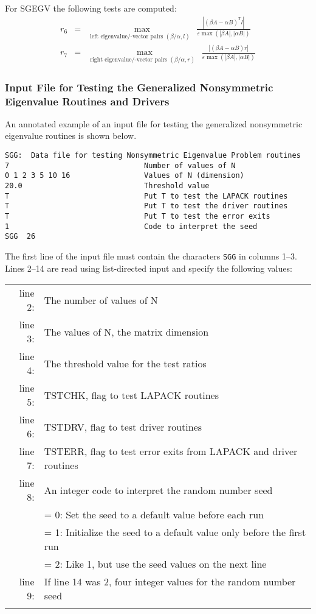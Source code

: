 For SGEGV the following tests are computed:
\begin{eqnarray}
    r_6 & = & \max_{\mbox{left eigenvalue/-vector pairs
		 	  $(\beta/\alpha,l)$ }}
              \frac{| (\beta A - \alpha B)^T l |}
		   { \varepsilon \max( |\beta A|, |\alpha B| ) } \nonumber\\
    r_7 & = & \max_{\mbox{right eigenvalue/-vector pairs
		    $(\beta/\alpha,r)$ }}
	      \frac{| (\beta A - \alpha B) r |}
		   { \varepsilon \max( |\beta A|, |\alpha B| ) } \nonumber
\end{eqnarray}

\subsubsection{Input File for Testing the
		Generalized Nonsymmetric Eigenvalue Routines and Drivers}

\dent
An annotated example of an input file for testing the generalized nonsymmetric
eigenvalue routines is shown below.

\begin{verbatim}
SGG:  Data file for testing Nonsymmetric Eigenvalue Problem routines
7                               Number of values of N
0 1 2 3 5 10 16                 Values of N (dimension)
20.0                            Threshold value
T                               Put T to test the LAPACK routines
T                               Put T to test the driver routines
T                               Put T to test the error exits
1                               Code to interpret the seed
SGG  26
\end{verbatim}

The first line of the input file 
must contain the characters {\tt SGG} in columns 1--3.
Lines 2--14 are read using list-directed input and specify the following
values:

\begin{tabular}{r l}
\\
line 2: & The number of values of N \\
line 3: & The values of N, the matrix dimension \\
line 4: & The threshold value for the test ratios \\
line 5: & TSTCHK, flag to test LAPACK routines \\
line 6: & TSTDRV, flag to test driver routines \\
line 7: & TSTERR, flag to test error exits from LAPACK and driver
routines \\ 
line 8: & An integer code to interpret the random number seed\\
        & = 0: Set the seed to a default value before each run \\ 
        & = 1: Initialize the seed to a default value only before the
first run \\
        & = 2: Like 1, but use the seed values on the next line \\
line 9: & If line 14 was 2, four integer values for the random number
seed \\
	&
\end{tabular}

